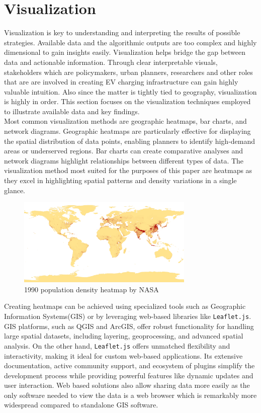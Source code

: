 \section{Visualization}\label{sec:visual}
Visualization is key to understanding and interpreting the results of possible strategies. Available data and the algorithmic outputs are too complex and highly dimensional to gain insights easily. Visualization helps bridge the gap between data and actionable information. Through clear interpretable visuals, stakeholders which are policymakers, urban planners, researchers and other roles that are are involved in creating EV charging infrastructure can gain highly valuable intuition. Also since the matter is tightly tied to geography, visualization is highly in order. This section focuses on the visualization techniques employed to illustrate available data and key findings.\\
Most common visualization methods are geographic heatmaps, bar charts, and network diagrams. Geographic heatmaps are particularly effective for displaying the spatial distribution of data points, enabling planners to identify high-demand areas or underserved regions. Bar charts can create comparative analyses and network diagrams highlight relationships between different types of data. The visualization method most suited for the purposes of this paper are heatmaps as they excel in highlighting spatial patterns and density variations in a single glance.\\
\begin{figure}[hbt!]
\begin{center}
\includegraphics[width=0.75\textwidth]{Bilder/Population_density.png}
\caption{1990 population density heatmap by NASA\cite{nasadensity}}\label{fig:nasapop}
\end{center}
\end{figure}
Creating heatmaps can be achieved using specialized tools such as Geographic Information Systems(GIS) or by leveraging web-based libraries like \verb|Leaflet.js|. \gls{GIS} platforms, such as QGIS and ArcGIS, offer robust functionality for handling large spatial datasets, including layering, geoprocessing, and advanced spatial analysis. On the other hand, \verb|Leaflet.js| offers unmatched flexibility and interactivity, making it ideal for custom web-based applications. Its extensive documentation, active community support, and ecosystem of plugins simplify the development process while providing powerful features like dynamic updates and user interaction. Web based solutions also allow sharing data more easily as the only software needed to view the data is a web browser which is remarkably more widespread compared to standalone GIS software.\\

